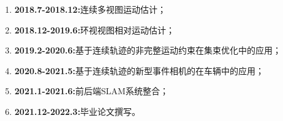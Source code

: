 \begin{enumerate}
    \item \textbf{2018.7-2018.12:}连续多视图运动估计；
    \item \textbf{2018.12-2019.6:}环视视图相对运动估计；
    \item \textbf{2019.2-2020.6:}基于连续轨迹的非完整运动约束在集束优化中的应用；
    \item \textbf{2020.8-2021.5:}基于连续轨迹的新型事件相机的在车辆中的应用；
    \item \textbf{2021.1-2021.6:}前后端SLAM系统整合；
    \item \textbf{2021.12-2022.3:}毕业论文撰写。
\end{enumerate}

{\small


}
